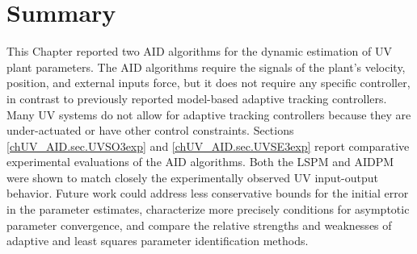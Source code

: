 \section{Summary}
\label{ch.UV_AID.summary}


This Chapter reported two \acf{AID} algorithms  for the dynamic
estimation of \acf{UV} plant parameters.
% 
The \acl{AID} algorithms require the signals of the plant's velocity,
position, and external inputs force, but it does not require any
specific controller, in contrast to previously reported model-based
adaptive tracking controllers.
% 
Many \acl{UV} systems do not allow for adaptive tracking controllers because
they are under-actuated or have other control constraints.
%
%
Sections \ref{chUV_AID.sec.UVSO3exp} and \ref{chUV_AID.sec.UVSE3exp}
report comparative experimental evaluations of the \acl{AID} algorithms.
%
Both the \acl{LSPM} and \acl{AIDPM} were shown to match
closely the experimentally observed \acl{UV} input-output behavior.
%
Future work could address less conservative bounds for the initial
error in the parameter estimates, characterize more
precisely conditions for asymptotic parameter convergence, and compare
the relative strengths and weaknesses of adaptive and least squares
parameter identification methods.

